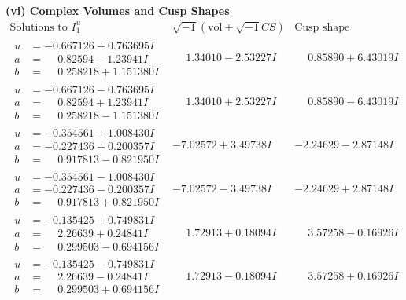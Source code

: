 \documentclass[1p]{elsarticle_modified}
\theoremstyle{definition}
\newcommand{\I}{\sqrt{-1}}
\begin{document}
\newpage\flushleft \textbf{(vi) Complex Volumes and Cusp Shapes}
$$\begin{array}{c|c|c}  
\text{Solutions to }I^u_{1}& \I (\text{vol} + \sqrt{-1}CS) & \text{Cusp shape}\\
 \hline 
\begin{aligned}
u &= -0.667126 + 0.763695 I \\
a &= \phantom{-}0.82594 - 1.23941 I \\
b &= \phantom{-}0.258218 + 1.151380 I\end{aligned}
 & \phantom{-}1.34010 - 2.53227 I & \phantom{-}0.85890 + 6.43019 I \\ \hline\begin{aligned}
u &= -0.667126 - 0.763695 I \\
a &= \phantom{-}0.82594 + 1.23941 I \\
b &= \phantom{-}0.258218 - 1.151380 I\end{aligned}
 & \phantom{-}1.34010 + 2.53227 I & \phantom{-}0.85890 - 6.43019 I \\ \hline\begin{aligned}
u &= -0.354561 + 1.008430 I \\
a &= -0.227436 + 0.200357 I \\
b &= \phantom{-}0.917813 - 0.821950 I\end{aligned}
 & -7.02572 + 3.49738 I & -2.24629 - 2.87148 I \\ \hline\begin{aligned}
u &= -0.354561 - 1.008430 I \\
a &= -0.227436 - 0.200357 I \\
b &= \phantom{-}0.917813 + 0.821950 I\end{aligned}
 & -7.02572 - 3.49738 I & -2.24629 + 2.87148 I \\ \hline\begin{aligned}
u &= -0.135425 + 0.749831 I \\
a &= \phantom{-}2.26639 + 0.24841 I \\
b &= \phantom{-}0.299503 - 0.694156 I\end{aligned}
 & \phantom{-}1.72913 + 0.18094 I & \phantom{-}3.57258 - 0.16926 I \\ \hline\begin{aligned}
u &= -0.135425 - 0.749831 I \\
a &= \phantom{-}2.26639 - 0.24841 I \\
b &= \phantom{-}0.299503 + 0.694156 I\end{aligned}
 & \phantom{-}1.72913 - 0.18094 I & \phantom{-}3.57258 + 0.16926 I \\ \hline\begin{aligned}

\end{aligned}
\end{array}$$
\end{document}
